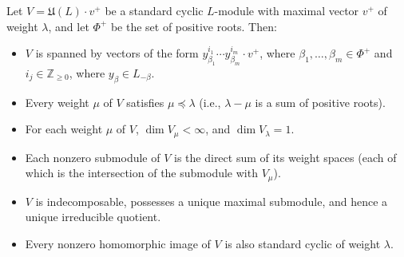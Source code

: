 Let $V = \mathfrak{U}(L)\cdot v^+$ be a standard cyclic $L$-module with maximal vector $v^+$ of weight $\lambda$, and let $\Phi^+$ be the set of positive roots. Then:
\begin{itemize}
\item[(a)] $V$ is spanned by vectors of the form $y_{\beta_1}^{i_1} \cdots y_{\beta_m}^{i_m} \cdot v^+$, where $\beta_1, \ldots, \beta_m \in \Phi^+$ and $i_j \in \mathbb{Z}_{\geq 0}$, where $y_\beta \in L_{-\beta}$.
\item[(b)] Every weight $\mu$ of $V$ satisfies $\mu \preceq \lambda$ (i.e., $\lambda - \mu$ is a sum of positive roots).
\item[(c)] For each weight $\mu$ of $V$, $\dim V_\mu < \infty$, and $\dim V_\lambda = 1$.
\item[(d)] Each nonzero submodule of $V$ is the direct sum of its weight spaces (each of which is the intersection of the submodule with $V_\mu$).
\item[(e)] $V$ is indecomposable, possesses a unique maximal submodule, and hence a unique irreducible quotient.
\item[(f)] Every nonzero homomorphic image of $V$ is also standard cyclic of weight $\lambda$.
\end{itemize}
